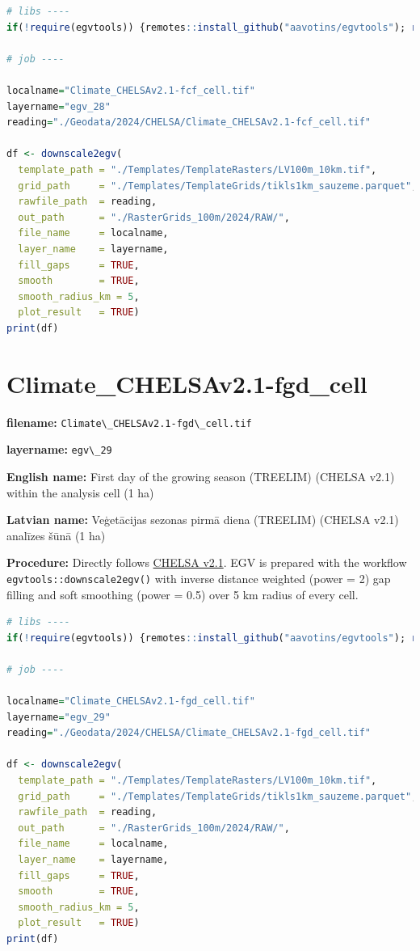 \documentclass[
]{book}
\newcommand{\passthrough}[1]{#1}
\begin{document}
\begin{lstlisting}[language=R]
# libs ----
if(!require(egvtools)) {remotes::install_github("aavotins/egvtools"); require(egvtools)}

# job ----

localname="Climate_CHELSAv2.1-fcf_cell.tif"
layername="egv_28"
reading="./Geodata/2024/CHELSA/Climate_CHELSAv2.1-fcf_cell.tif"

df <- downscale2egv(
  template_path = "./Templates/TemplateRasters/LV100m_10km.tif",
  grid_path     = "./Templates/TemplateGrids/tikls1km_sauzeme.parquet",
  rawfile_path  = reading,
  out_path      = "./RasterGrids_100m/2024/RAW/",
  file_name     = localname,
  layer_name    = layername,
  fill_gaps     = TRUE,
  smooth        = TRUE,
  smooth_radius_km = 5,
  plot_result   = TRUE)
print(df)
\end{lstlisting}

\section{Climate\_CHELSAv2.1-fgd\_cell}\label{ch06.029}

\textbf{filename:} \passthrough{\lstinline!Climate\_CHELSAv2.1-fgd\_cell.tif!}

\textbf{layername:} \passthrough{\lstinline!egv\_29!}

\textbf{English name:} First day of the growing season (TREELIM) (CHELSA v2.1) within the analysis cell (1 ha)

\textbf{Latvian name:} Veģetācijas sezonas pirmā diena (TREELIM) (CHELSA v2.1) analīzes šūnā (1 ha)

\textbf{Procedure:} Directly follows \hyperref[Ch04.11]{CHELSA v2.1}. EGV is prepared with the
workflow \passthrough{\lstinline!egvtools::downscale2egv()!} with inverse distance weighted (power = 2)
gap filling and soft smoothing (power = 0.5) over 5 km radius of every cell.

\begin{lstlisting}[language=R]
# libs ----
if(!require(egvtools)) {remotes::install_github("aavotins/egvtools"); require(egvtools)}

# job ----

localname="Climate_CHELSAv2.1-fgd_cell.tif"
layername="egv_29"
reading="./Geodata/2024/CHELSA/Climate_CHELSAv2.1-fgd_cell.tif"

df <- downscale2egv(
  template_path = "./Templates/TemplateRasters/LV100m_10km.tif",
  grid_path     = "./Templates/TemplateGrids/tikls1km_sauzeme.parquet",
  rawfile_path  = reading,
  out_path      = "./RasterGrids_100m/2024/RAW/",
  file_name     = localname,
  layer_name    = layername,
  fill_gaps     = TRUE,
  smooth        = TRUE,
  smooth_radius_km = 5,
  plot_result   = TRUE)
print(df)
\end{lstlisting}
\end{document}
